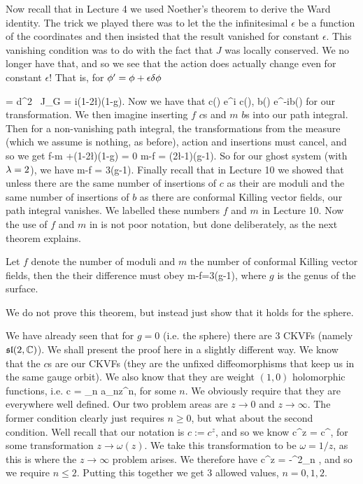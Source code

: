 Now recall that in Lecture 4 we used Noether's theorem to derive the Ward identity. The trick we played there was to let the the infinitesimal $\epsilon$ be a function of the coordinates and then insisted that the result vanished for constant $\epsilon$. This vanishing condition was to do with the fact that $J$ was locally conserved. We no longer have that, and so we see that the action does actually change even for constant $\epsilon$! That is, for $\phi'=\phi+\epsilon\delta\phi$

\bse 
     =  \int d^2\sig {} \, \nabla \cdot J_G = i(1-2\l)(1-g).
\ese
Now we have that 
\bse 
    c(\sig) \to e^{i\epsilon} c(\sig), \qand b(\sig) \to e^{-i\epsilon}b(\sig)
\ese 
for our transformation. We then imagine inserting $f$ $c$s and $m$ $b$s into our path integral. Then for a non-vanishing path integral, the transformations from the measure (which we assume is nothing, as before), action and insertions must cancel, and so we get 
\be 
\label{eqn:cbnumbergenus}
    f-m +(1-2\l)(1-g) = 0 \qquad \implies \qquad  m-f = (2\l-1)(g-1).
\ee 
So for our ghost system (with $\lambda=2$), we have 
\be 
\label{eqn:cbnumbergenusghost}
    m-f = 3(g-1).
\ee 
Finally recall that in Lecture 10 we showed that unless there are the same number of insertions of $c$ as their are moduli and the same number of insertions of $b$ as there are conformal Killing vector fields, our path integral vanishes. We labelled these numbers $f$ and $m$ in Lecture 10. Now the use of $f$ and $m$ in  is not poor notation, but done deliberately, as the next theorem explains. 

\bt 
    Let $f$ denote the number of moduli and $m$ the number of conformal Killing vector fields, then the their difference must obey 
    \bse 
        m-f=3(g-1),
    \ese 
    where $g$ is the genus of the surface. 
\et 

We do not prove this theorem, but instead just show that it holds for the sphere. 

\bex 
    We have already seen that for $g=0$ (i.e. the sphere) there are 3 CKVFs (namely $\mathfrak{sl}(2,\mathbb{C})$). We shall present the proof here in a slightly different way. We know that the $c$s are our CKVFs (they are the unfixed diffeomorphisms that keep us in the same gauge orbit). We also know that they are weight $(1,0)$ holomorphic functions, i.e. 
    \bse 
        c = \sum_n a_nz^n,
    \ese 
    for some $n$. We obviously require that they are everywhere well defined. Our two problem areas are $z\to0$ and $z\to\infty$. The former condition clearly just requires $n\geq0$, but what about the second condition. Well recall that our notation is $c := c^z$, and so we know 
    \bse
        c^z = c^{\omega},
    \ese
    for some transformation $z\to\omega(z)$. We take this transformation to be $\omega=1/z$, as this is where the $z\to\infty$ problem arises. We therefore have 
    \bse 
        c^{z} = -\omega^2\sum_n ,
    \ese 
    and so we require $n\leq 2$. Putting this together we get 3 allowed values, $n=0,1,2$. 
    
